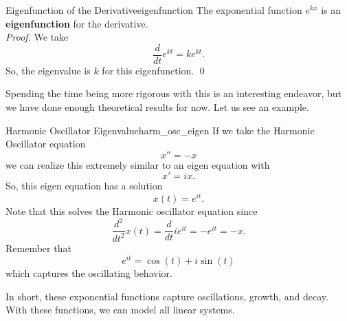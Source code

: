         \begin{prop}{Eigenfunction of the Derivative}{eigenfunction}
        The exponential function $e^{kx}$ is an \textbf{eigenfunction} for the derivative.  \\
        
        \noindent \emph{Proof.} We take 
        \[
        \frac{d}{dt} e^{kt} = ke^{kt}.
        \]
        So, the eigenvalue is $k$ for this eigenfunction. \qed
        \end{prop}
        
        
        Spending the time being more rigorous with this is an interesting endeavor, but we have done enough theoretical results for now.  Let us see an example.
        
        \begin{ex}{Harmonic Oscillator Eigenvalue}{harm_osc_eigen}
        If we take the Harmonic Oscillator equation
        \[
        x'' = -x
        \]
        we can realize this extremely similar to an eigen equation with
        \[
        x'=ix.
        \]
        So, this eigen equation has a solution
        \[
        x(t)=e^{it}.
        \]
        Note that this solves the Harmonic oscillator equation since
        \[
        \frac{d^2}{dt^2} x(t) = \frac{d}{dt}ie^{it} = -e^{it}=-x.
        \]
        Remember that
        \[
        e^{it}=\cos(t)+i\sin(t)
        \]
        which captures the oscillating behavior.
        \end{ex}
        
        In short, these exponential functions capture oscillations, growth, and decay.  With these functions, we can model all linear systems.
        
